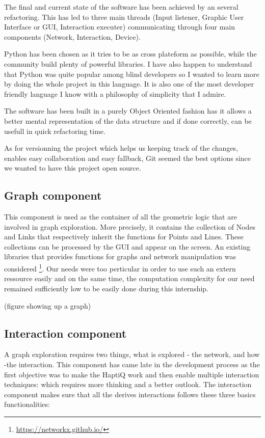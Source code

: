 The final and current state of the software has been achieved by an
several refactoring. This has led to
three main threads (Input listener, Graphic User Interface or GUI,
Interaction executer) communicating through four main components
(Network, Interaction, Device).

Python has been chosen as it tries to be as cross plateform as possible, while the community build plenty of powerful libraries. I have also happen to understand that Python was quite popular among blind developers so I wanted to learn more by doing the whole project in this language. It is also one of the most developer friendly language I know with a philosophy of simplicity that I admire.

The software has been built in a purely Object Oriented fashion has it allows a better mental representation of the data structure and if done correctly, can be usefull in quick refactoring time.

As for versionning the project which helps us keeping track of the changes, enables easy collaboration and easy fallback, Git seemed the best options since we wanted to have this project open source.

\subsection{Graph component}\label{graph-component}

This component is used as the container of all the geometric logic that
are involved in graph exploration. More precisely, it contains the
collection of Nodes and Links that respectively inherit the functions
for Points and Lines. These collections can be processed by the GUI and
appear on the screen. An existing libraries that provides functions for
graphs and network manipulation was considered \footnote{\url{https://networkx.github.io/}}.
Our needs were too perticular in order to use such an extern ressource
easily and on the same time, the computation complexity for our need
remained sufficiently low to be easily done during this internship.

(figure showing up a graph)

\subsection{Interaction component}\label{interaction-component}

A graph exploration requires two things, what is explored - the network,
and how -the interaction. This component has came late in the
development process as the first objective was to make the HaptiQ work
and then enable multiple interaction techniques: which requires more
thinking and a better outlook. The interaction component makes sure that
all the derives interactions follows these three basics functionalities:

